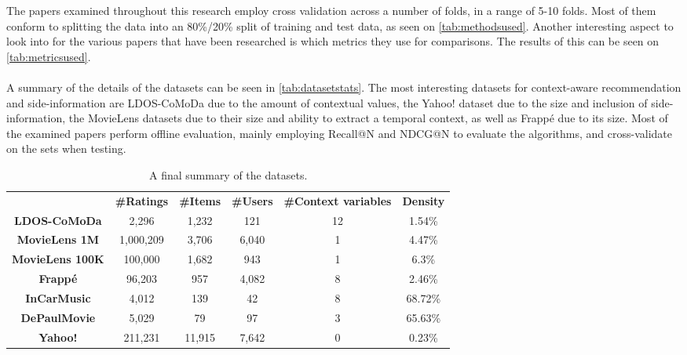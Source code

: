 The papers examined throughout this research employ cross validation across a number of folds, in a range of 5-10 folds.
Most of them conform to splitting the data into an 80\%/20\% split of training and test data, as seen on \autoref{tab:methodsused}.
Another interesting aspect to look into for the various papers that have been researched is which metrics they use for comparisons.
The results of this can be seen on \autoref{tab:metricsused}.
\\\\
A summary of the details of the datasets can be seen in \autoref{tab:datasetstats}.
The most interesting datasets for context-aware recommendation and side-information are LDOS-CoMoDa due to the amount of contextual values, the Yahoo! dataset due to the size and inclusion of side-information, the MovieLens datasets due to their size and ability to extract a temporal context, as well as Frappé due to its size.
Most of the examined papers perform offline evaluation, mainly employing Recall@N and NDCG@N to evaluate the algorithms, and cross-validate on the sets when testing.
\begin{table*}[]\centering
    \caption{A final summary of the datasets.}\label{tab:datasetstats}
    \scriptsize
    \begin{tabular}{cccccc}\toprule
        &\textbf{\#Ratings} & \textbf{\#Items} & \textbf{\#Users} & \textbf{\#Context variables} & \textbf{Density}\\\cmidrule{1-6}
        \textbf{LDOS-CoMoDa} & 2,296 & 1,232 & 121 & 12 & 1.54\% \\\cmidrule{1-6}
        \textbf{MovieLens 1M} & 1,000,209 & 3,706 & 6,040 & 1 & 4.47\% \\\cmidrule{1-6}
        \textbf{MovieLens 100K} & 100,000 & 1,682 & 943 & 1 & 6.3\% \\\cmidrule{1-6}
        \textbf{Frappé} & 96,203 & 957 & 4,082 & 8 & 2.46\% \\\cmidrule{1-6}
        \textbf{InCarMusic} & 4,012 & 139 & 42 & 8 & 68.72\% \\\cmidrule{1-6}
        \textbf{DePaulMovie} & 5,029 & 79 & 97 & 3 & 65.63\% \\\cmidrule{1-6}
        \textbf{Yahoo!} & 211,231 & 11,915 & 7,642 & 0 & 0.23\% \\\cmidrule{1-6}
    \bottomrule
    \end{tabular}
\end{table*}